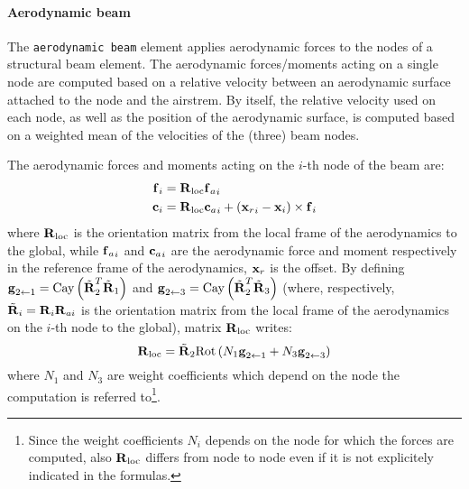 \paragraph{Aerodynamic beam}

The \texttt{aerodynamic beam} element applies aerodynamic forces
to the nodes of a structural beam element. 
The aerodynamic forces/moments acting on a single node 
are computed based on a relative 
velocity between an aerodynamic surface attached 
to the node and the airstrem. By itself, the relative velocity 
used on each node, as well as the position of the aerodynamic 
surface, is computed based on a weighted mean of the velocities
of the (three) beam nodes. 

\newcommand{\Rloc}{{\TT{R}_{\text{loc}}}}
\newcommand{\Rtilde}[1]{\tilde{\TT{R}}_{#1}}
\newcommand{\Cay}[1]{\text{Cay}\plbr{#1}}
\newcommand{\Rot}[1]{\text{Rot}\plbr{#1}}
The aerodynamic forces and moments acting on the $i$-th node of the
beam are:
\begin{subequations}\label{eq:fici}
\begin{align}
	\T{f}_i &= \Rloc {\T{f}_a}_i\\ 
	\T{c}_i &= \Rloc {\T{c}_a}_i 
		+ \plbr{{\T{x}_r}_i - \T{x}_i}\times{\T{f}}_i 
\end{align}
\end{subequations}
where $\Rloc$ is the orientation 
matrix from the local frame of the aerodynamics
to the global, while ${\bm{\mathbf{f}}_a}_i$ and ${\bm{\mathbf{c}}_a}_i$ are the 
aerodynamic force and moment 
respectively in the reference frame of the aerodynamics, $\bm{\mathbf{x}}_r$
is the offset. 
By defining $\T{g}_{2\leftarrow{1}} = \Cay{\Rtilde{2}^T\Rtilde{1}}$ 
and $\T{g}_{2\leftarrow{3}} = \Cay{\Rtilde{2}^T\Rtilde{3}}$ (where, respectively,
$\Rtilde{i} = \TT{R}_i\TT{R}_{ai}$ is the orientation matrix from the 
local frame of the aerodynamics on the $i$-th node to the global),
matrix $\Rloc$ writes:
\begin{equation}
	\Rloc = \Rtilde{2} \Rot{N_1\T{g}_{2\leftarrow{1}} + N_3\T{g}_{2\leftarrow{3}}}
\end{equation}
where $N_1$ and $N_3$ are weight coefficients which depend on
the node the computation is referred to\footnote{Since the 
weight coefficients $N_i$ depends on the node for which the
forces are computed, also $\Rloc$ differs from node to node
even if it is not explicitely indicated in the formulas. }.

